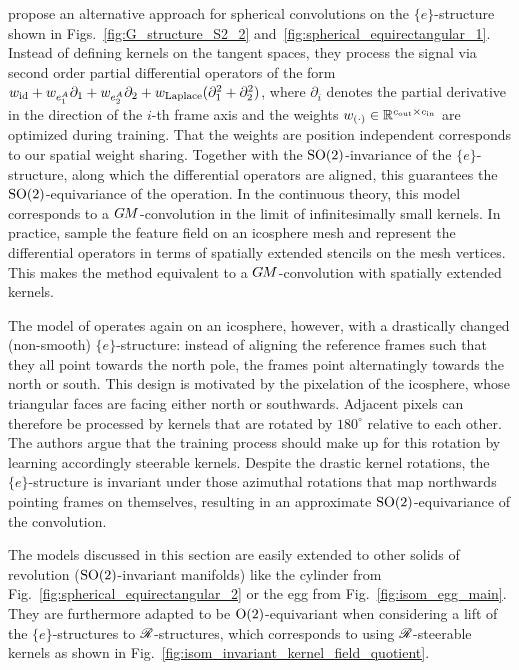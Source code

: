 \citet{jiang2019spherical} propose an alternative approach for spherical convolutions on the $\{e\}$-structure shown in Figs.~\ref{fig:G_structure_S2_2} and~\ref{fig:spherical_equirectangular_1}.
Instead of defining kernels on the tangent spaces, they process the signal via second order partial differential operators of the form $w_{\mathrm{id}} + w_{e^A_1} \partial_1 + w_{e^A_2} \partial_2 + w_\textup{Laplace} (\partial_1^2 + \partial_2^2)$, where $\partial_i$ denotes the partial derivative in the direction of the $i$-th frame axis and the weights $w_{(\cdot)} \in \mathbb{R}^{{c_\textup{out}}\times{c_\textup{in}}}$ are optimized during training.
That the weights are position independent corresponds to our spatial weight sharing.
Together with the $\operatorname{SO}(2)$-invariance of the $\{e\}$-structure, along which the differential operators are aligned, this guarantees the $\operatorname{SO}(2)$-equivariance of the operation.
In the continuous theory, this model corresponds to a $G\mkern-1.4muM$-convolution in the limit of infinitesimally small kernels.
In practice, \citet{jiang2019spherical} sample the feature field on an icosphere mesh and represent the differential operators in terms of spatially extended stencils on the mesh vertices.
This makes the method equivalent to a $G\mkern-1.4muM$-convolution with spatially extended kernels.


The model of \citet{lee2019spherephd} operates again on an icosphere, however, with a drastically changed (non-smooth) $\{e\}$-structure:
instead of aligning the reference frames such that they all point towards the north pole, the frames point alternatingly towards the north or south.
This design is motivated by the pixelation of the icosphere, whose triangular faces are facing either north or southwards.
Adjacent pixels can therefore be processed by kernels that are rotated by $180^\circ$ relative to each other.
The authors argue that the training process should make up for this rotation by learning accordingly steerable kernels.
Despite the drastic kernel rotations, the $\{e\}$-structure is invariant under those azimuthal rotations that map northwards pointing frames on themselves, resulting in an approximate $\operatorname{SO}(2)$-equivariance of the convolution.


The models discussed in this section are easily extended to other solids of revolution ($\operatorname{SO}(2)$-invariant manifolds) like the cylinder from Fig.~\ref{fig:spherical_equirectangular_2} or the egg from Fig.~\ref{fig:isom_egg_main}.
They are furthermore adapted to be $\operatorname{O}(2)$-equivariant when considering a lift of the $\{e\}$-structures to $\mathscr{R}$-structures, which corresponds to using $\mathscr{R}$-steerable kernels as shown in Fig.~\ref{fig:isom_invariant_kernel_field_quotient}.

